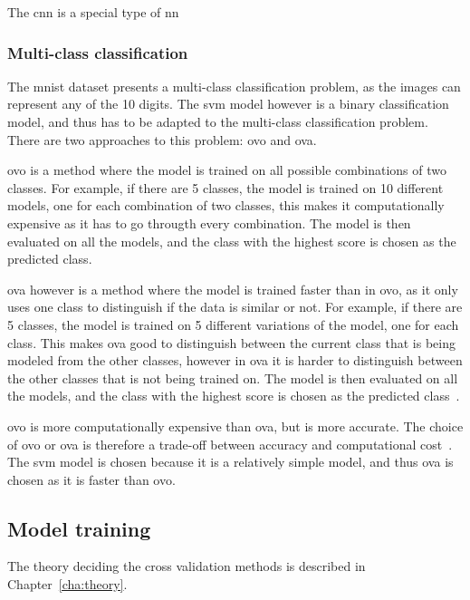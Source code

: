 The \gls{cnn} is a special type of \gls{nn}



\subsubsection{Multi-class classification}\label{subsubsec:multi-class-classification}
The \gls{mnist} dataset presents a multi-class classification problem, as the images can represent any of the 10 digits. The \gls{svm} model however is a binary classification model, and thus has to be adapted to the multi-class classification problem. There are two approaches to this problem: \gls{ovo} and \gls{ova}.

\gls{ovo} is a method where the model is trained on all possible combinations of two classes. For example, if there are 5 classes, the model is trained on 10 different models, one for each combination of two classes, this makes it computationally expensive as it has to go througth every combination. The model is then evaluated on all the models, and the class with the highest score is chosen as the predicted class.

\gls{ova} however is a method where the model is trained faster than in \gls{ovo}, as it only uses one class to distinguish if the data is similar or not. For example, if there are 5 classes, the model is trained on 5 different variations of the model, one for each class. This makes \gls{ova} good to distinguish between the current class that is being modeled from the other classes, however in \gls{ova} it is harder to distinguish between the other classes that is not being trained on. The model is then evaluated on all the models, and the class with the highest score is chosen as the predicted class~\cite{james-statistical-learning}.

\gls{ovo} is more computationally expensive than \gls{ova}, but is more accurate. The choice of \gls{ovo} or \gls{ova} is therefore a trade-off between accuracy and computational cost~\cite{james-statistical-learning}. The \gls{svm} model is chosen because it is a relatively simple model, and thus \gls{ova} is chosen as it is faster than \gls{ovo}.

\subsection{Model training}\label{subsec:model-training}
The theory deciding the cross validation methods is described in Chapter~\ref{cha:theory}.
